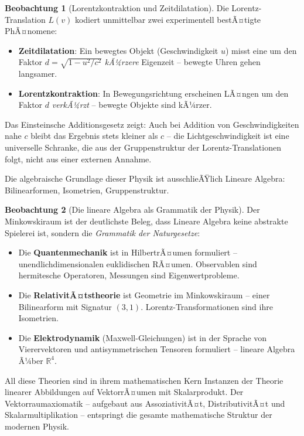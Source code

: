 ﻿\documentclass[a4paper,12pt]{report}
\theoremstyle{definition}
\newtheorem{beobachtung}{Beobachtung}
\begin{document}
\begin{beobachtung}[Lorentzkontraktion und Zeitdilatation]
    Die Lorentz-Translation $L(v)$ kodiert unmittelbar zwei
    experimentell bestÃ¤tigte PhÃ¤nomene:
    \begin{itemize}
        \item[-] \textbf{Zeitdilatation}: Ein bewegtes Objekt (Geschwindigkeit $u$)
              misst eine um den Faktor $d = \sqrt{1 - u^2/c^2}$ \emph{kÃ¼rzere}
              Eigenzeit -- bewegte Uhren gehen langsamer.
        \item[-] \textbf{Lorentzkontraktion}: In Bewegungsrichtung erscheinen
              LÃ¤ngen um den Faktor $d$ \emph{verkÃ¼rzt} -- bewegte Objekte
              sind kÃ¼rzer.
    \end{itemize}
    Das Einsteinsche Additionsgesetz zeigt: Auch bei Addition von
    Geschwindigkeiten nahe $c$ bleibt das Ergebnis stets kleiner als $c$
    -- die Lichtgeschwindigkeit ist eine universelle Schranke,
    die aus der Gruppenstruktur der Lorentz-Translationen folgt,
    nicht aus einer externen Annahme.

    Die algebraische Grundlage dieser Physik ist ausschlieÃŸlich
    Lineare Algebra: Bilinearformen, Isometrien, Gruppenstruktur.
\end{beobachtung}

\begin{beobachtung}[Die lineare Algebra als Grammatik der Physik]
    Der Minkowskiraum ist der deutlichste Beleg, dass Lineare Algebra
    keine abstrakte Spielerei ist, sondern die \emph{Grammatik der
    Naturgesetze}:
    \begin{itemize}
        \item[-] Die \textbf{Quantenmechanik} ist in HilbertrÃ¤umen formuliert
              -- unendlichdimensionalen euklidischen RÃ¤umen. Observablen
              sind hermitesche Operatoren, Messungen sind Eigenwertprobleme.
        \item[-] Die \textbf{RelativitÃ¤tstheorie} ist Geometrie im
              Minkowskiraum -- einer Bilinearform mit Signatur $(3,1)$.
              Lorentz-Transformationen sind ihre Isometrien.
        \item[-] Die \textbf{Elektrodynamik} (Maxwell-Gleichungen) ist
              in der Sprache von Vierervektoren und antisymmetrischen
              Tensoren formuliert -- lineare Algebra Ã¼ber $\mathbb{R}^4$.
    \end{itemize}
    All diese Theorien sind in ihrem mathematischen Kern Instanzen der
    Theorie linearer Abbildungen auf VektorrÃ¤umen mit Skalarprodukt.
    Der Vektorraumaxiomatik -- aufgebaut aus AssoziativitÃ¤t, DistributivitÃ¤t
    und Skalarmultiplikation -- entspringt die gesamte mathematische
    Struktur der modernen Physik.
\end{beobachtung}
\end{document}
